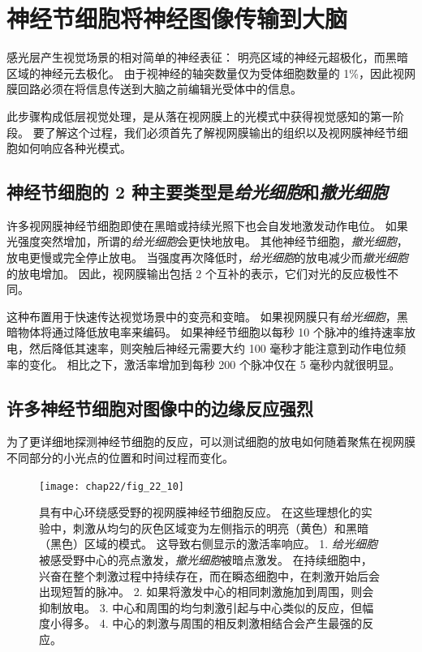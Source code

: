 \section{神经节细胞将神经图像传输到大脑}

感光层产生视觉场景的相对简单的神经表征：
明亮区域的神经元超极化，而黑暗区域的神经元去极化。
由于视神经的轴突数量仅为受体细胞数量的 1\%，因此视网膜回路必须在将信息传送到大脑之前编辑光受体中的信息。


此步骤构成低层视觉处理，是从落在视网膜上的光模式中获得视觉感知的第一阶段。
要了解这个过程，我们必须首先了解视网膜输出的组织以及视网膜神经节细胞如何响应各种光模式。



\subsection{神经节细胞的 2 种主要类型是\textit{给光细胞}和\textit{撤光细胞}}

许多视网膜神经节细胞即使在黑暗或持续光照下也会自发地激发动作电位。
如果光强度突然增加，所谓的\textit{给光细胞}会更快地放电。
其他神经节细胞，\textit{撤光细胞}，放电更慢或完全停止放电。
当强度再次降低时，\textit{给光细胞}的放电减少而\textit{撤光细胞}的放电增加。
因此，视网膜输出包括 2 个互补的表示，它们对光的反应极性不同。


这种布置用于快速传达视觉场景中的变亮和变暗。
如果视网膜只有\textit{给光细胞}，黑暗物体将通过降低放电率来编码。
如果神经节细胞以每秒 10 个脉冲的维持速率放电，然后降低其速率，则突触后神经元需要大约 100 毫秒才能注意到动作电位频率的变化。
相比之下，激活率增加到每秒 200 个脉冲仅在 5 毫秒内就很明显。



\subsection{许多神经节细胞对图像中的边缘反应强烈}

为了更详细地探测神经节细胞的反应，可以测试细胞的放电如何随着聚焦在视网膜不同部分的小光点的位置和时间过程而变化。


\begin{figure}[htbp]
	\centering
	\texttt{[image: chap22/fig\_22\_10]}
	\caption{具有中心环绕感受野的视网膜神经节细胞反应。 
		在这些理想化的实验中，刺激从均匀的灰色区域变为左侧指示的明亮（黄色）和黑暗（黑色）区域的模式。 这导致右侧显示的激活率响应。 
		1. \textit{给光细胞}被感受野中心的亮点激发，\textit{撤光细胞}被暗点激发。
		在持续细胞中，兴奋在整个刺激过程中持续存在，而在瞬态细胞中，在刺激开始后会出现短暂的脉冲。 
		2. 如果将激发中心的相同刺激施加到周围，则会抑制放电。 
		3. 中心和周围的均匀刺激引起与中心类似的反应，但幅度小得多。 
		4. 中心的刺激与周围的相反刺激相结合会产生最强的反应。}
	\label{fig:22_10}
\end{figure}


